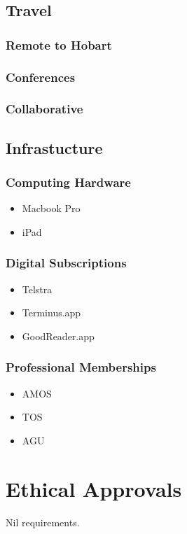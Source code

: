 \documentclass[11pt,a4paper]{article}
\begin{document}
\subsection{Travel}
\subsubsection{Remote to Hobart}
\subsubsection{Conferences}
\subsubsection{Collaborative}
\subsection{Infrastucture}
\subsubsection{Computing Hardware}
\begin{itemize}
\item Macbook Pro
\item iPad
\end{itemize}
\subsubsection{Digital Subscriptions}
\begin{itemize}
\item Telstra
\item Terminus.app
\item GoodReader.app
\end{itemize}
\subsubsection{Professional Memberships}
\begin{itemize}
\item AMOS
\item TOS
\item AGU
\end{itemize}
\section*{Ethical Approvals}
%
Nil requirements.
\end{document}
